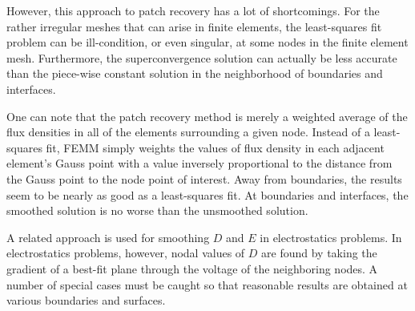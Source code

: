 \documentclass[12pt]{report}
\begin{document}
However, this approach to patch recovery has a lot of shortcomings.
For the rather irregular meshes that can arise in finite elements,
the least-squares fit problem can be ill-condition, or even
singular, at some nodes in the finite element mesh.  Furthermore,
the superconvergence solution can actually be less accurate than
the piece-wise constant solution in the neighborhood of boundaries
and interfaces.

One can note that the patch recovery method is merely a weighted
average of the flux densities in all of the elements surrounding a
given node.  Instead of a least-squares fit, FEMM simply weights
the values of flux density in each adjacent element's Gauss point
with a value inversely proportional to the distance from the Gauss
point to the node point of interest.  Away from boundaries, the
results seem to be nearly as good as a least-squares fit.  At
boundaries and interfaces, the smoothed solution is no worse than
the unsmoothed solution.

A related approach is used for smoothing $D$ and $E$ in
electrostatics problems. In electrostatics problems, however, nodal
values of $D$ are found by taking the gradient of a best-fit plane
through the voltage of the neighboring nodes. A number of special
cases must be caught so that reasonable results are obtained at
various boundaries and surfaces.
\end{document}
